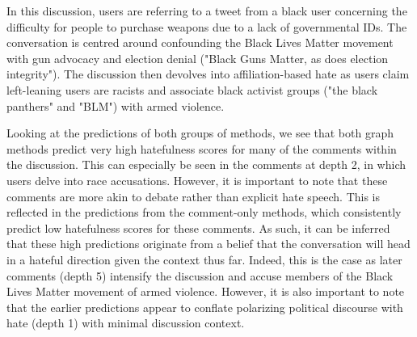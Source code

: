 \documentclass[letterpaper]{article} %
\begin{document}
In this discussion, users are referring to a tweet from a black user concerning the difficulty for people to purchase weapons due to a lack of governmental IDs. The conversation is centred around confounding the Black Lives Matter movement with gun advocacy and election denial ("Black Guns Matter, as does election integrity"). The discussion then devolves into affiliation-based hate as users claim left-leaning users are racists and associate black activist groups ("the black panthers" and "BLM") with armed violence. 

Looking at the predictions of both groups of methods, we see that both graph methods predict very high hatefulness scores for many of the comments within the discussion. This can especially be seen in the comments at depth 2, in which users delve into race accusations. However, it is important to note that these comments are more akin to debate rather than explicit hate speech. This is reflected in the predictions from the comment-only methods, which consistently predict low hatefulness scores for these comments. As such, it can be inferred that these high predictions originate from a belief that the conversation will head in a hateful direction given the context thus far. Indeed, this is the case as later comments (depth 5) intensify the discussion and accuse members of the Black Lives Matter movement of armed violence. However, it is also important to note that the earlier predictions appear to conflate polarizing political discourse with hate (depth 1) with minimal discussion context. 
\end{document}
